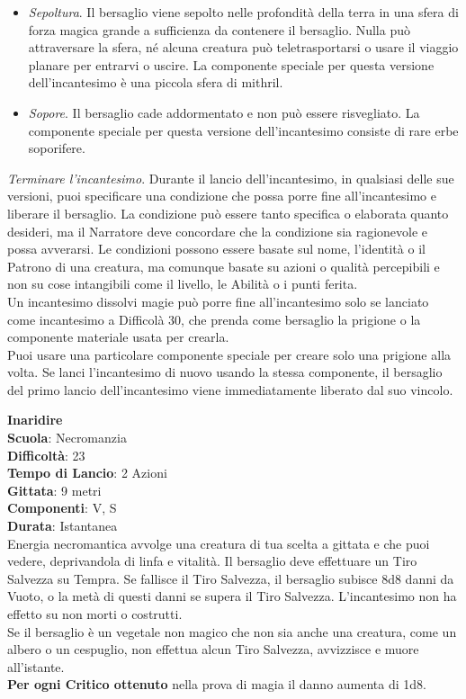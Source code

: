 \begin{multicols}{2}
\begin{itemize}
\item
\textit{Sepoltura}. Il bersaglio viene sepolto nelle profondità della terra in una sfera di forza magica grande a sufficienza da contenere il bersaglio. Nulla può attraversare la sfera, né alcuna creatura può teletrasportarsi o usare il viaggio planare per entrarvi o uscire. La componente speciale per questa versione dell'incantesimo è una piccola sfera di mithril. 
\item
\textit{Sopore}. Il bersaglio cade addormentato e non può essere risvegliato. La componente speciale per questa versione dell'incantesimo consiste di rare erbe soporifere.
\end{itemize}
\medskip
\textit{Terminare l'incantesimo}. Durante il lancio dell'incantesimo, in qualsiasi delle sue versioni, puoi specificare una condizione che possa porre fine all'incantesimo e liberare il bersaglio. La condizione può essere tanto specifica o elaborata quanto desideri, ma il Narratore deve concordare che la condizione sia ragionevole e possa avverarsi. Le condizioni possono essere basate sul nome, l'identità o il Patrono di una creatura, ma comunque basate su azioni o qualità percepibili e non su cose intangibili come il livello, le Abilità o i punti ferita.\\
Un incantesimo dissolvi magie può porre fine all'incantesimo solo se lanciato come incantesimo a Difficolà 30, che prenda come bersaglio la prigione o la componente materiale usata per crearla.\\
Puoi usare una particolare componente speciale per creare solo una prigione alla volta. Se lanci l'incantesimo di nuovo usando la stessa componente, il bersaglio del primo lancio dell'incantesimo viene immediatamente liberato dal suo vincolo.

\medskip\textbf{Inaridire}\\
\textbf{Scuola}: Necromanzia\\
\textbf{Difficoltà}: 23\\
\textbf{Tempo di Lancio}: 2 Azioni\\
\textbf{Gittata}: 9 metri\\
\textbf{Componenti}: V, S\\
\textbf{Durata}: Istantanea\\
Energia necromantica avvolge una creatura di tua scelta a gittata e che puoi vedere, deprivandola di linfa e vitalità. Il bersaglio deve effettuare un Tiro Salvezza su Tempra. Se fallisce il Tiro Salvezza, il bersaglio subisce 8d8 danni da Vuoto, o la metà di questi danni se supera il Tiro Salvezza. L'incantesimo non ha effetto su non morti o costrutti.\\
Se il bersaglio è un vegetale non magico che non sia anche una creatura, come un albero o un cespuglio, non effettua alcun Tiro Salvezza, avvizzisce e muore all'istante.\\
\textbf{Per ogni Critico ottenuto} nella prova di magia il danno aumenta di 1d8.


\end{multicols}
